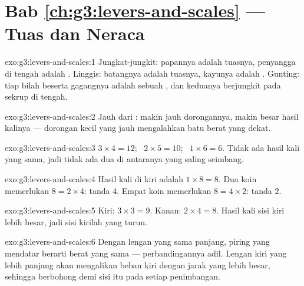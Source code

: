 \section*{Bab \ref{ch:g3:levers-and-scales} --- Tuas dan Neraca}

\begin{solution}{exo:g3:levers-and-scales:1}
Jungkat-jungkit: papannya adalah tuasnya, penyangga di tengah adalah
. Linggis: batangnya adalah tuasnya, kayunya adalah
. Gunting: tiap bilah beserta gagangnya adalah sebuah
, dan keduanya berjungkit pada sekrup di tengah.
\end{solution}

\begin{solution}{exo:g3:levers-and-scales:2}
Jauh dari : makin jauh dorongannya, makin besar hasil
kalinya --- dorongan kecil yang jauh mengalahkan batu berat yang
dekat.
\end{solution}

\begin{solution}{exo:g3:levers-and-scales:3}
$3 \times 4 = 12$; \ $2 \times 5 = 10$; \ $1 \times 6 = 6$. Tidak ada
hasil kali yang sama, jadi tidak ada dua di antaranya yang saling
seimbang.
\end{solution}

\begin{solution}{exo:g3:levers-and-scales:4}
Hasil kali di kiri adalah $1 \times 8 = 8$. Dua koin memerlukan $8 = 2 \times
4$: tanda $4$. Empat koin memerlukan $8 = 4 \times 2$: tanda $2$.
\end{solution}

\begin{solution}{exo:g3:levers-and-scales:5}
Kiri: $3 \times 3 = 9$. Kanan: $2 \times 4 = 8$. Hasil kali sisi kiri
lebih besar, jadi sisi kirilah yang turun.
\end{solution}

\begin{solution}{exo:g3:levers-and-scales:6}
Dengan lengan yang sama panjang, piring yang mendatar berarti berat
yang sama --- perbandingannya adil. Lengan kiri yang lebih panjang
akan mengalikan beban kiri dengan jarak yang lebih besar, sehingga
 berbohong demi sisi itu pada setiap penimbangan.
\end{solution}

